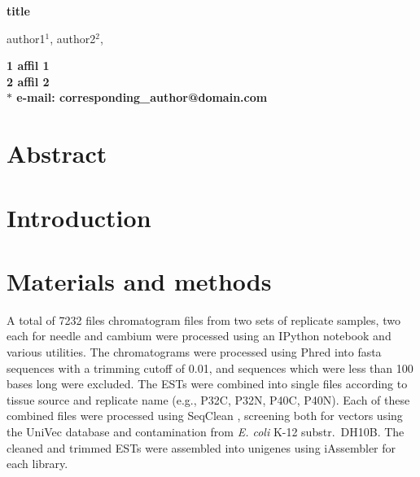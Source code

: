 \documentclass[11pt]{article}
\begin{document}
\begin{flushleft} 
\singlespacing
{\large \textbf{title}}

author1$^{1}$, 
author2$^{2}$,


\bf{1} affil 1
\\
\bf{2} affil 2
\\

$\ast$ e-mail: corresponding\_author@domain.com
\end{flushleft}

\section*{Abstract}

\section*{Introduction}

\section*{Materials and methods}\label{ss:mats}
A total of 7232 files chromatogram files from two sets of replicate
samples, two each for needle and cambium were processed using an
IPython \citep[v 2.1]{per-gra:2007} notebook and various utilities.
The chromatograms were processed using Phred \citep[v.\
020425]{ewing1998b} into fasta sequences with a trimming cutoff of
0.01, and sequences which were less than 100 bases long were excluded.
The ESTs were combined into single files according to tissue source
and replicate name (e.g., P32C, P32N, P40C, P40N).  Each of these
combined files were processed using SeqClean \citep[v.\
2/2011][default parameters]{citeulike:1911083}, screening both for
vectors using the UniVec \citep{cochrane01012010} database and
contamination from \textit{E. coli} K-12 substr.\ DH10B.  The cleaned
and trimmed ESTs were assembled into unigenes using iAssembler
\citep[v.\ 1.3.2][default parameters]{zheng2011iassembler} for each library.
\end{document}
